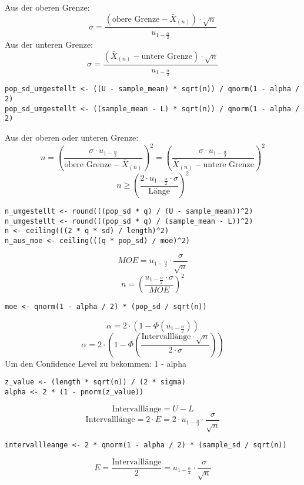 \begin{multicols*}{2}
Aus der oberen Grenze:
$$
\sigma = \frac{\left( \text{obere Grenze} - \bar{X}_{(n)} \right) \cdot \sqrt{n}}{u_{1 - \frac{\alpha}{2}}}
$$
Aus der unteren Grenze:
$$
\sigma = \frac{\left( \bar{X}_{(n)} - \text{untere Grenze} \right) \cdot \sqrt{n}}{u_{1 - \frac{\alpha}{2}}}
$$
\begin{lstlisting}
pop_sd_umgestellt <- ((U - sample_mean) * sqrt(n)) / qnorm(1 - alpha / 2)
pop_sd_umgestellt <- ((sample_mean - L) * sqrt(n)) / qnorm(1 - alpha / 2)
\end{lstlisting}


Aus der oberen oder unteren Grenze:
$$
n = \left( \frac{\sigma \cdot u_{1 - \frac{\alpha}{2}}}{ \text{obere Grenze}-\bar{X}_{(n)}} \right)^2 = \left( \frac{\sigma \cdot u_{1 - \frac{\alpha}{2}}}{\bar{X}_{(n)} - \text{untere Grenze}} \right)^2$$
$$
n \geq \left( \frac{2 \cdot u_{1 - \frac{\alpha}{2}} \cdot \sigma}{\text{Länge}} \right)^2
$$
\begin{lstlisting}
n_umgestellt <- round(((pop_sd * q) / (U - sample_mean))^2)
n_umgestellt <- round(((pop_sd * q) / (sample_mean - L))^2)
n <- ceiling(((2 * q * sd) / length)^2)
n_aus_moe <- ceiling(((q * pop_sd) / moe)^2)
\end{lstlisting}
$$
MOE = u_{1 - \frac{\alpha}{2}} \cdot \frac{\sigma}{\sqrt{n}}
$$
$$
n = \left( \frac{u_{1 - \frac{\alpha}{2}} \cdot \sigma}{MOE} \right)^2
$$
\begin{lstlisting}
moe <- qnorm(1 - alpha / 2) * (pop_sd / sqrt(n))
\end{lstlisting}
$$
\alpha = 2 \cdot \left( 1 - \Phi(u_{1 - \frac{\alpha}{2}}) \right)
$$
$$
\alpha = 2 \cdot \left( 1 - \Phi\left(\frac{\text{Intervalllänge} \cdot \sqrt{n}}{2 \cdot \sigma}\right) \right)
$$
\textcolor{red}{\warning}Um den Confidence Level zu bekommen: 1 - alpha \textcolor{red}{\warning}
\begin{lstlisting}
z_value <- (length * sqrt(n)) / (2 * sigma)
alpha <- 2 * (1 - pnorm(z_value))
\end{lstlisting}

$$
\text{Intervalllänge} = U - L
$$
$$
\text{Intervalllänge} = 2 \cdot E = 2 \cdot u_{1 - \frac{\alpha}{2}} \cdot \frac{\sigma}{\sqrt{n}}
$$
\begin{lstlisting}
intervallleange <- 2 * qnorm(1 - alpha / 2) * (sample_sd / sqrt(n))
\end{lstlisting}

$$
E = \frac{\text{Intervalllänge}}{2} = u_{1 - \frac{\alpha}{2}} \cdot \frac{\sigma}{\sqrt{n}}
$$

\end{multicols*}